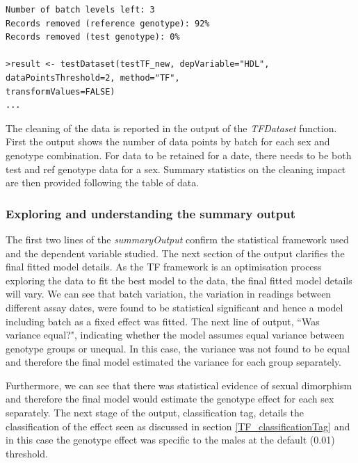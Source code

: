 \documentclass[12pt,a4paper]{article}
\begin{document}
\begin{verbatim}
Number of batch levels left: 3
Records removed (reference genotype): 92%
Records removed (test genotype): 0%

>result <- testDataset(testTF_new, depVariable="HDL", dataPointsThreshold=2, method="TF",
transformValues=FALSE) 
...
\end{verbatim}
\endgroup 

The cleaning of the data is reported in the output of the \textit{TFDataset} function.  First the output shows the number of data points by batch for each sex and genotype combination.  For data to be retained for a date, there needs to be both test and ref genotype data for a sex. Summary statistics on the cleaning impact are then provided following the table of data.  

\subsubsection{Exploring and understanding the summary output}
The first two lines of the \textit{summaryOutput} confirm the statistical framework used and the dependent variable studied. The next section of the output clarifies the final fitted model details. As the TF framework is an optimisation process exploring the data to fit the best model to the data, the final fitted model details will vary. We can see that batch variation, the variation in readings between different assay dates, were found to be statistical significant and hence a model including batch as a fixed effect was fitted.  The next line of output, “Was variance equal?", indicating whether the model assumes equal variance between genotype groups or unequal. In this case, the variance was not found to be equal and therefore the final model estimated the variance for each group separately.

Furthermore, we can see that there was statistical evidence of sexual dimorphism and therefore the final model would estimate the genotype effect for each sex separately. The next stage of the output, classification tag, details the classification of the effect seen as discussed in section \ref{TF_classificationTag} and in this case the genotype effect was specific to the males at the default (0.01) threshold. 
\end{document}
